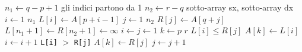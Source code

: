 \begin{codebox}
\li $n_1 \gets q-p+1$
    \Comment gli indici partono da 1
\li $n_2 \gets r-q$
\zi \Comment {} sotto-array sx,  sotto-array dx
\li \For $i \gets 1$ \To $n_1$
\li \Do
        $L[i] \gets A[p+i-1]$
    \End
\li	\For $j \gets 1$ \To $n_2$
\li	\Do
		$R[j] \gets A[q+j]$
    \End
\li $L[n_1+1] \gets R[n_2+1] \gets \infty$
\li $i \gets j \gets 1$
\li \For $k \gets p$ \To $r$
\li \Do
    	\If $L[i] \leq R[j]$
\li     \Then
            $A[k] \gets L[i]$
\li         $i \gets i+1$
\li     \Else
        	\Comment \texttt{L[i]} $>$ \texttt{R[j]}
\li         $A[k] \gets R[j]$
\li         $j \gets j+1$
		\End
	\End
\end{codebox}